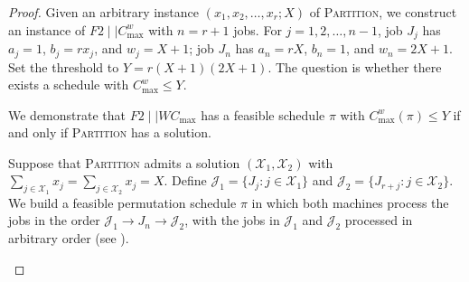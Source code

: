 \documentclass[12pt]{article} \textheight=24.5cm \textwidth=16.5cm \parskip = 0.165cm
\begin{document}
\begin{sloppypar}
\begin{proof}
            Given an arbitrary instance $(x_1, x_2, \ldots, x_r; X)$ of \textsc{Partition}, we construct an instance of $F2 \mid \mid C_{\max}^w$ with $n=r+1$ jobs.
            For $j=1, 2, \ldots, n-1$, job $J_j$ has $a_j=1$, $b_j=r x_j$, and $w_j=X+1$; job $J_n$ has $a_n=rX$, $b_n=1$, and $w_n=2X+1$.
            Set the threshold to $Y=r(X+1)(2X+1)$.
            The question is whether there exists a schedule with $C_{\max}^w \leq Y$.
            
            We demonstrate that $F2 \mid \mid W C_{\max}$ has a feasible schedule $\pi$ with $C_{\max}^w(\pi) \leq Y$ if and only if \textsc{Partition} has a solution.
            
            Suppose that \textsc{Partition} admits a solution $(\mathcal{X}_1, \mathcal{X}_2)$ with $\sum_{j \in \mathcal{X}_1} x_j = \sum_{j \in \mathcal{X}_2} x_j=X$.
            Define $\mathcal{J}_1=\{J_j: j \in \mathcal{X}_1\}$ and $\mathcal{J}_2=\{J_{r+j}: j \in \mathcal{X}_2\}$.
            We build a feasible permutation schedule $\pi$ in which both machines process the jobs in the order $\mathcal{J}_1 \to J_n \to \mathcal{J}_2$, with the jobs in $\mathcal{J}_1$ and $\mathcal{J}_2$ processed in arbitrary order (see ).
            \begin{figure}[H]
                \centering
\end{figure}
\end{proof}
\end{sloppypar}
\end{document}
